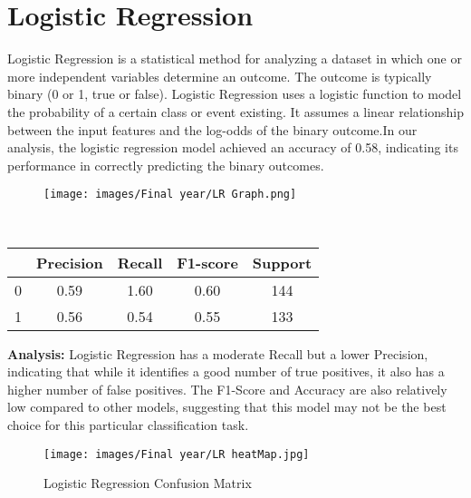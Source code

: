 \documentclass{report}
\begin{document}
{\section{Logistic Regression}
Logistic Regression is a statistical method for analyzing a dataset in which one or more independent variables determine an outcome. The outcome is typically binary (0 or 1, true or false). Logistic Regression uses a logistic function to model the probability of a certain class or event existing. It assumes a linear relationship between the input features and the log-odds of the binary outcome.In our analysis, the logistic regression model achieved an accuracy of 0.58, indicating its performance in correctly predicting the binary outcomes. \\
\vspace{1cm}
    \begin{figure}[h!]
    \centering
        \texttt{[image: images/Final year/LR Graph.png]} %
    \end{figure} \\

\begin{center}
\begin{tabular}{|c|c|c|c|c|}
  \hline
   & Precision & Recall & F1-score & Support \\
  \hline
  0 & 0.59 & 1.60 & 0.60 & 144 \\
  1 & 0.56 & 0.54 & 0.55 & 133 \\
  \hline
\end{tabular}
\end{center}
\textbf{Analysis: }   Logistic Regression has a moderate Recall but a lower Precision, indicating that while it identifies a good number of true positives, it also has a higher number of false positives. The F1-Score and Accuracy are also relatively low compared to other models, suggesting that this model may not be the best choice for this particular classification task.
\vspace{1cm}
    \begin{figure}[h!]
    \centering
        \texttt{[image: images/Final year/LR heatMap.jpg]} %
        \caption{Logistic Regression Confusion Matrix}
    \end{figure}
\\ \\ \\ \\ \\ \\
}
\end{document}
